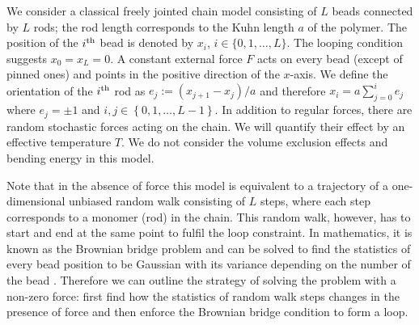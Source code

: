 \documentclass[aps,showpacs,twocolumn,floatfix,prx,superscriptaddress]{revtex4-1}
\begin{document}
We consider a classical freely jointed chain model consisting of $L$ beads connected by $L$ rods; the rod length corresponds to the Kuhn length $a$ of the polymer. The position of the $i^{\rm th}$ bead is denoted by $x_i$, $i\in\{0,1, \ldots,L\}$. The looping condition suggests $x_0=x_L=0$. A constant external force $F$ acts on every bead (except of pinned ones) and points in the positive direction of the $x$-axis.  We define the orientation of the $i^{\rm th}$ rod as $e_j:=(x_{j+1} - x_{j})/a$ and therefore $x_i =
a\sum_{j=0}^{i} e_j$ where $e_j=\pm 1$ and $i,j \in \left\{0, 1, \ldots,
    L-1\right\}$. In addition to regular forces, there are random stochastic forces acting on the chain. We will quantify their effect by an effective temperature $T$. We do not consider the volume exclusion effects and bending
energy in this model.

Note that in the absence of force this model is equivalent to a trajectory of a one-dimensional unbiased random walk consisting of $L$ steps, where each step corresponds to a monomer (rod) in the chain. This random walk, however, has to start and end at the same point to fulfil the loop constraint. In mathematics, it is known as the Brownian bridge problem and can be solved to find the statistics of every bead position to be Gaussian with its variance depending on the number of the bead \cite{}. Therefore we can outline the strategy of solving the problem with a non-zero force: first find how the statistics of random walk steps changes in the presence of force and then enforce the Brownian bridge condition to form a loop. 
\end{document}
